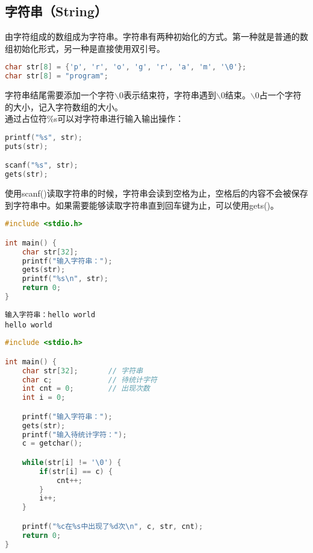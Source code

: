\subsection{字符串（String）}

由字符组成的数组成为字符串。字符串有两种初始化的方式。第一种就是普通的数组初始化形式，另一种是直接使用双引号。

\vspace{-0.5cm}

\begin{lstlisting}[language=C]
char str[8] = {'p', 'r', 'o', 'g', 'r', 'a', 'm', '\0'};
char str[8] = "program";
\end{lstlisting}

字符串结尾需要添加一个字符$ \backslash $0表示结束符，字符串遇到$ \backslash $0结束。$ \backslash $0占一个字符的大小，记入字符数组的大小。\\

通过占位符\%s可以对字符串进行输入输出操作：

\vspace{-0.5cm}

\begin{lstlisting}[language=C]
printf("%s", str);
puts(str);

scanf("%s", str);
gets(str);
\end{lstlisting}

使用scanf()读取字符串的时候，字符串会读到空格为止，空格后的内容不会被保存到字符串中。如果需要能够读取字符串直到回车键为止，可以使用gets()。\\


\begin{lstlisting}[language=C]
#include <stdio.h>

int main() {
	char str[32];
	printf("输入字符串：");
	gets(str);
	printf("%s\n", str);
	return 0;
}
\end{lstlisting}

\begin{tcolorbox}
	\begin{verbatim}
输入字符串：hello world
hello world
	\end{verbatim}
\end{tcolorbox}

\vspace{0.5cm}


\begin{lstlisting}[language=C]
#include <stdio.h>

int main() {
	char str[32];       // 字符串
	char c;             // 待统计字符
	int cnt = 0;        // 出现次数
	int i = 0;

	printf("输入字符串：");
	gets(str);
	printf("输入待统计字符：");
	c = getchar();

	while(str[i] != '\0') {
		if(str[i] == c) {
			cnt++;
		}
		i++;
	}

	printf("%c在%s中出现了%d次\n", c, str, cnt);
	return 0;
}
\end{lstlisting}

